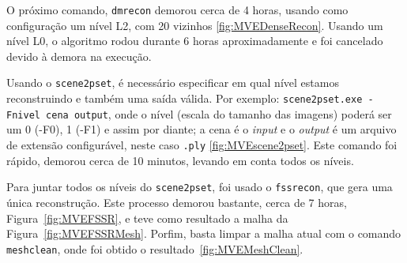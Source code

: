 O próximo comando, \texttt{dmrecon} demorou cerca de 4 horas, usando como
configuração um nível L2, com 20 vizinhos \ref{fig:MVEDenseRecon}.  Usando um
nível L0, o algoritmo rodou durante 6 horas aproximadamente e foi cancelado
devido à demora na execução. 


Usando o \texttt{scene2pset}, é necessário especificar em qual nível estamos
reconstruindo e também uma saída válida. Por exemplo: \texttt{scene2pset.exe -Fnivel
cena output}, onde o nível (escala do tamanho das imagens) poderá ser um 0 (-F0), 1 (-F1) e assim por diante; a
cena é o \emph{input} e o \emph{output} é um arquivo de extensão configurável,
neste caso \texttt{.ply} \ref{fig:MVEscene2pset}. Este comando foi rápido, demorou
cerca de 10 minutos, levando em conta todos os níveis.


Para juntar todos os níveis do \texttt{scene2pset}, foi usado o \texttt{fssrecon},
que gera uma única reconstrução. Este processo demorou bastante, cerca de 7
horas, Figura~\ref{fig:MVEFSSR}, e teve como resultado a malha da Figura~\ref{fig:MVEFSSRMesh}.
Porfim, basta limpar a malha atual com o comando \texttt{meshclean}, onde foi
obtido o resultado~\ref{fig:MVEMeshClean}.


